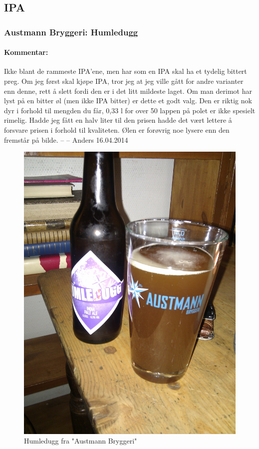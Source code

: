 \documentclass[12pt,a4paper,oneside,norsk]{article}
\begin{document}
\newpage
\subsection{IPA}
\subsubsection{Austmann Bryggeri: Humledugg}
\paragraph{Kommentar:} Ikke blant de rammeste IPA'ene, men har som en IPA skal ha et tydelig bittert preg. Om jeg først skal kjøpe IPA, tror jeg at jeg ville gått for andre varianter enn denne, rett å slett fordi den er i det litt mildeste laget. Om man derimot har lyst på en bitter øl (men ikke IPA bitter) er dette et godt valg. Den er riktig nok dyr i forhold til mengden du får, 0,33 l for over 50 lappen på polet er ikke spesielt rimelig. Hadde jeg fått en halv liter til den prisen hadde det vært lettere å forsvare prisen i forhold til kvaliteten. Ølen er forøvrig noe lysere enn den fremstår på bilde.
\newline
-- -- Anders 16.04.2014

\begin{figure} [H]
\centering
\includegraphics[scale=0.1, angle=0]{Bilder/Ol/humledugg.jpg}
\caption{Humledugg fra "Austmann Bryggeri"}
\end{figure}
\end{document}
